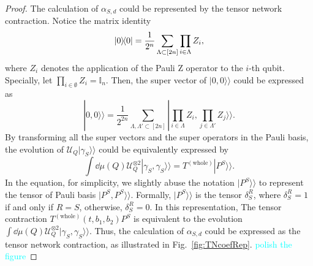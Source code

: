 \documentclass{article}
\newcommand{\Twhole}{T^{(\text{whole})}}
\newcommand{\supket}[1]{|#1 \rangle\rangle}
\begin{document}
\begin{proof}
The calculation of $\alpha_{S,d}$ could be represented by the tensor network contraction.
Notice the matrix identity 
\begin{equation}
    \ketbra{0} = \frac{1}{2^n} \sum_{\Lambda\subset [2n]} \prod_{i \in \Lambda} Z_i,
\end{equation}
where $Z_i$ denotes the application of the Pauli Z operator to the $i$-th qubit.
Specially, let $\prod_{i \in \emptyset} Z_i = \mathbb{I}_n$. Then, the super vector of $\supket{0,0}$ could be expressed as
\begin{equation}
\label{eq: zz anonymous 6}
    \supket{0,0} = \frac{1}{2^{2n}} \sum_{\Lambda, \Lambda' \subset [2n]}  \supket{\prod_{i \in \Lambda }  Z_i, \prod_{j \in \Lambda'} Z_j}.
\end{equation}
By transforming all the super vectors and the super operators in the Pauli basis, 
the evolution of $\mathcal{U}_Q \supket{\gamma_S}$ could be equivalently expressed by 
\begin{equation}
\label{eq: transfer evolution of U to tensor}
    \int \dd\mu(Q) \mathcal{U}_Q^{\otimes 2} \supket{\gamma_S,\gamma_S} = \Twhole \supket{P^S}.
\end{equation}
In the equation, for simplicity, we slightly abuse the notation $\supket{P^S}$ to represent the tensor of Pauli basis $\supket{P^S, P^S}$. Formally, $\supket{P^S}$ is the tensor $\delta_{S}^{R}$, where $\delta_{S}^{R}=1$ if and only if $R=S$, otherwise, $\delta_{S}^{R}=0$. In this representation, The tensor contraction $\Twhole(t, b_1, b_2) P^S$ is equivalent to the evolution $\int \dd\mu(Q) \mathcal{U}_Q^{\otimes 2} \supket{\gamma_S,\gamma_S}$. Thus, the calculation of $\alpha_{S,d}$ could be expressed as the tensor network contraction, as illustrated in Fig.~\ref{fig:TNcoefRep}. \textcolor{cyan}{polish the figure}








\end{proof}
\end{document}
